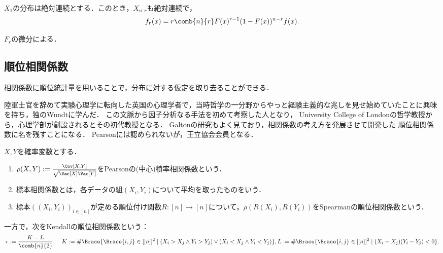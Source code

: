\documentclass[uplatex,dvipdfmx]{jsreport}
\begin{document}
\begin{corollary}
    $X_1$の分布は絶対連続とする．このとき，$X_{n:r}$も絶対連続で，
    \[f_r(x)=r\comb{n}{r}F(x)^{r-1}(1-F(x))^{n-r}f(x).\]
\end{corollary}
\begin{Proof}
    $F_r$の微分による．
\end{Proof}

\subsection{順位相関係数}

\begin{tcolorbox}[colframe=ForestGreen, colback=ForestGreen!10!white,breakable,colbacktitle=ForestGreen!40!white,coltitle=black,fonttitle=\bfseries\sffamily,
title=]
    相関係数に順位統計量を用いることで，分布に対する仮定を取り去ることができる．
\end{tcolorbox}

\begin{history}
    陸軍士官を辞めて実験心理学に転向した英国の心理学者で，当時哲学の一分野からやっと経験主義的な兆しを見せ始めていたことに興味を持ち，独のWundtに学んだ．
    この文脈から因子分析なる手法を初めて考察した\cite{Spearman04}人となり，
    University College of Londonの哲学教授から，心理学部が創設されるとその初代教授となる．
    Galtonの研究もよく見ており，相関係数の考え方を発展させて開発した
    順位相関係数に名を残すことになる．
    Pearsonには認められないが，王立協会会員となる．
\end{history}

\begin{history}
    
\end{history}

\begin{definition}
    $X,Y$を確率変数とする．
    \begin{enumerate}
        \item $\rho(X,Y):=\frac{\Cov[X,Y]}{\sqrt{\Var[X]\Var[Y]}}$をPearsonの(中心)積率相関係数という．
        \item 標本相関係数とは，各データの組$(X_i,Y_i)$について平均を取ったものをいう．
        \item 標本$((X_i,Y_i))_{i\in[n]}$が定める順位付け関数$R:[n]\to[n]$について，$\rho(R(X_i),R(Y_i))$をSpearmanの順位相関係数という．
    \end{enumerate}
    一方で，次をKendallの順位相関係数という：
    \[\tau:=\frac{K-L}{\comb{n}{2}},\quad K:=\#\Brace{\Brace{i,j}\in[[n]]^2\mid(X_i>X_j\land Y_i>Y_j)\lor(X_i<X_j\land Y_i<Y_j)},L:=\#\Brace{\Brace{i,j}\in[[n]]^2\mid (X_i-X_j)(Y_i-Y_j)<0}.\]
\end{definition}
\end{document}
